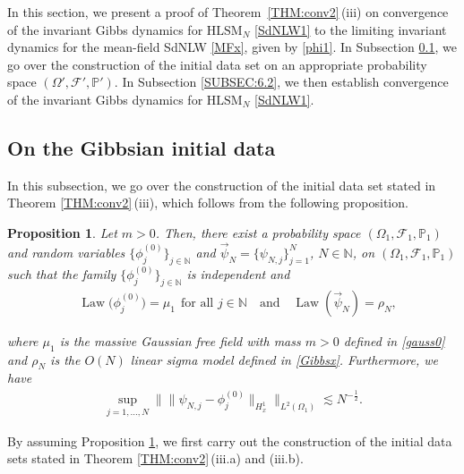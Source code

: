 \documentclass[letterpaper, 11pt,  reqno]{amsart}
\newtheorem{proposition}[theorem]{Proposition}
\DeclareMathOperator{\Law}{Law}
\newcommand{\1}{\hspace{0.5mm}\text{I}\hspace{0.2mm}}
\newcommand{\noi}{\noindent}
\newcommand{\N}{\mathbb{N}}
\newcommand{\PP}{\mathbb{P}}
\newcommand{\les}{\lesssim}
\newcommand{\F}{\mathcal{F}}
\newcommand{\HLS}{$\text{HLSM}_N$ }
\renewcommand{\O}{\Omega}
\numberwithin{equation}{section}
\numberwithin{theorem}{section}
\begin{document}
In this section, 
we present a proof of 
Theorem~\ref{THM:conv2}\,(iii)
on convergence of the invariant Gibbs dynamics for 
\HLS
\eqref{SdNLW1}
to the limiting invariant dynamics 
for the mean-field SdNLW \eqref{MFx}, 
given by \eqref{phi1}.
In Subsection \ref{SUBSEC:6.1}, 
we go over the construction of the initial data set
on an appropriate probability space $(\O', \F', \PP')$.
In Subsection \ref{SUBSEC:6.2}, 
we then establish convergence of the 
invariant Gibbs dynamics for \HLS 
\eqref{SdNLW1}.




\subsection{On the Gibbsian initial data}
\label{SUBSEC:6.1}


In this subsection, 
we go over the construction of the initial data set
stated in 
Theorem \ref{THM:conv2}\,(iii), 
which follows from the following proposition.




\begin{proposition}
\label{PROP:rand}
Let $m > 0$.
 Then, there exist a probability space $(\O_1, \F_1, \PP_1)$ and random variables 
 $\big\{ \phi^{(0)}_{j} \big\}_{j \in \N}$ and 
 $\vec \psi_N = \{\psi_{N, j}\}_{j = 1}^N$, $N \in \N$,  on 
 $(\O_1, \F_1, \PP_1)$ such that 
 the family $\big\{ \phi^{(0)}_j \big\}_{j \in \N}$ is independent
 and 
\begin{align}
&\Law \big(\phi^{(0)}_j\big) = \mu_1 \ \  \text{for all } j \in \N 
\quad \text{and}\quad 
\Law (\vec \psi_N )= \rho_N ,
\label{rand1}
\end{align}

\noi
where $\mu_1$
is the massive Gaussian free field with mass $m > 0$
defined  in \eqref{gauss0} 
and $\rho_N$
is  the $O(N)$ linear sigma model %
defined in \eqref{Gibbsx}.
Furthermore, we have
\begin{align}
\sup_{j =1, \dots, N}\Big\|  \big\| \psi_{N, j} - \phi^{(0)}_j \big\|_{H^1_x}\Big\|_{L^2(\O_1)}
 \les N^{-\frac 12 } .
\label{rand2}
\end{align}


\end{proposition}



By assuming 
 Proposition \ref{PROP:rand}, 
we first carry out the construction of 
the initial data sets stated in Theorem \ref{THM:conv2}\,(iii.a) and (iii.b).
\end{document}

